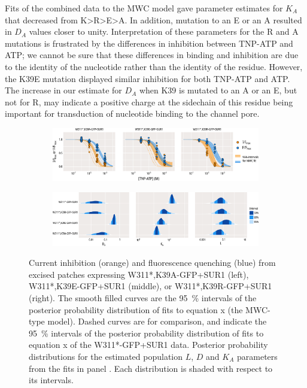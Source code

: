 Fits of the combined data to the MWC model gave parameter estimates for $K_A$ that decreased from K>R>E>A.
In addition, mutation to an E or an A resulted in $D_A$ values closer to unity.
Interpretation of these parameters for the R and A mutations is frustrated by the differences in inhibition between TNP-ATP and ATP; we cannot be sure that these differences in binding and inhibition are due to the identity of the nucleotide rather than the identity of the residue.
However, the K39E mutation displayed similar inhibition for both TNP-ATP and ATP.
The increase in our estimate for $D_A$ when K39 is mutated to an A or an E, but not for R, may indicate a positive charge at the sidechain of this residue being important for transduction of nucleotide binding to the channel pore.

\begin{figure}[h]
	\centering
	\begin{subfigure}[t]{0.9\textwidth}
		\caption{}\label{ch5fig:mwc_k39_1}
		\centering
		\includegraphics[width=\textwidth]{mwc_k39_1.pdf}
	\end{subfigure}
	\vfill
	\begin{subfigure}[t]{0.9\textwidth}
		\caption{}\label{ch5fig:mwc_k39_2}
		\centering
		\includegraphics[width=\textwidth]{mwc_k39_2.pdf}
	\end{subfigure}
	\caption[K39 mutations affect gating and nucleotide binding]{
	 Current inhibition (orange) and fluorescence quenching (blue) from excised patches expressing W311*,K39A-GFP+SUR1 (left), W311*,K39E-GFP+SUR1 (middle), or W311*,K39R-GFP+SUR1 (right).
	The smooth filled curves are the \SI{95}{\percent} intervals of the posterior probability distribution of fits to equation x (the MWC-type model).
	Dashed curves are for comparison, and indicate the \SI{95}{\percent} intervals of the posterior probability distribution of fits to equation x of the W311*-GFP+SUR1 data.
	 Posterior probability distributions for the estimated population $L$, $D$ and $K_A$ parameters from the fits in panel .
	Each distribution is shaded with respect to its intervals.
	}\label{ch5fig:k39_2}
\end{figure}

